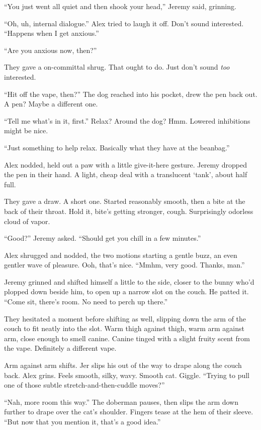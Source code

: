 ``You just went all quiet and then shook your head,'' Jeremy said, grinning.

``Oh, uh, internal dialogue.'' Alex tried to laugh it off. Don't sound interested. ``Happens when I get anxious.''

``Are you anxious now, then?''

They gave a on-committal shrug. That ought to do. Just don't sound \emph{too} interested.

``Hit off the vape, then?'' The dog reached into his pocket, drew the pen back out. A pen? Maybe a different one.

``Tell me what's in it, first.'' Relax? Around the dog? Hmm. Lowered inhibitions might be nice.

``Just something to help relax. Basically what they have at the beanbag.''

Alex nodded, held out a paw with a little give-it-here gesture. Jeremy dropped the pen in their hand. A light, cheap deal with a translucent `tank', about half full.

They gave a draw. A short one. Started reasonably smooth, then a bite at the back of their throat. Hold it, bite's getting stronger, cough. Surprisingly odorless cloud of vapor.

``Good?'' Jeremy asked. ``Should get you chill in a few minutes.''

Alex shrugged and nodded, the two motions starting a gentle buzz, an even gentler wave of pleasure. Ooh, that's nice. ``Mmhm, very good. Thanks, man.''

Jeremy grinned and shifted himself a little to the side, closer to the bunny who'd plopped down beside him, to open up a narrow slot on the couch. He patted it. ``Come sit, there's room. No need to perch up there.''

They hesitated a moment before shifting as well, slipping down the arm of the couch to fit neatly into the slot. Warm thigh against thigh, warm arm against arm, close enough to smell canine. Canine tinged with a slight fruity scent from the vape. Definitely a different vape.

Arm against arm shifts. Jer slips his out of the way to drape along the couch back. Alex grins. Feels smooth, silky, wavy. Smooth cat. Giggle. ``Trying to pull one of those subtle stretch-and-then-cuddle moves?''

``Nah, more room this way.'' The doberman pauses, then slips the arm down further to drape over the cat's shoulder. Fingers tease at the hem of their sleeve. ``But now that you mention it, that's a good idea.''

